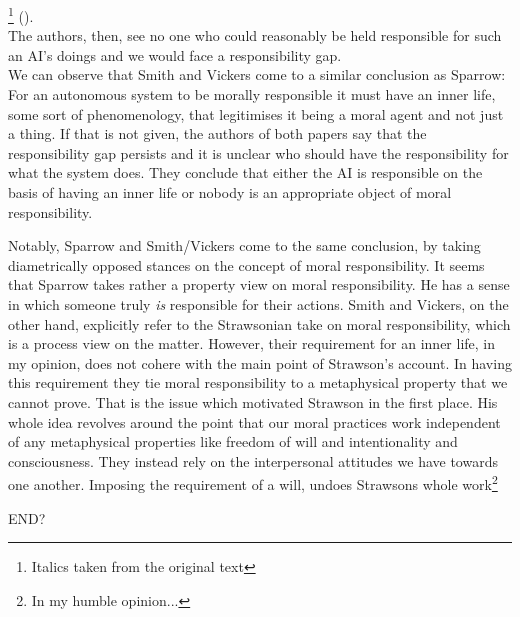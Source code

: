 \documentclass{article}
\begin{document}
\footnote{Italics
taken from the original text} (\cite[p. 4-5]{SmithVickers2021}).\\

The authors,
then, see no one who could reasonably be held responsible for such an AI's doings
and we would face a responsibility gap.\\

We can observe that Smith and Vickers come to a similar conclusion as Sparrow:
For an autonomous system to be morally responsible it must have an inner life,
some sort of phenomenology, that legitimises it being a moral agent and not just
a thing. If that is not given, the authors of both papers say that the
responsibility gap persists and it is unclear who should have the responsibility
for what the system does. They conclude that either the AI is responsible on the
basis of having an inner life or nobody is an appropriate object of moral
responsibility.

Notably, Sparrow and Smith/Vickers come to the same conclusion, by taking
diametrically opposed stances on the concept of moral responsibility. It seems
that Sparrow takes rather a property view on moral responsibility. He has a
sense in which someone truly \textit{is} responsible for their actions. Smith
and Vickers, on the other hand, explicitly refer to the Strawsonian take on
moral responsibility, which is a process view on the matter. However, their
requirement for an inner life, in my opinion, does not cohere with the main point
of Strawson's account. In having this requirement they tie moral responsibility
to a metaphysical property that we cannot prove. That is the issue which
motivated Strawson in the first place. His whole idea revolves around the point
that our moral practices work independent of any metaphysical properties like
freedom of will and intentionality and consciousness. They instead rely on the
interpersonal attitudes we have towards one another. Imposing the requirement of
a will, undoes Strawsons whole work\footnote{In my humble opinion...}


END?
\end{document}

